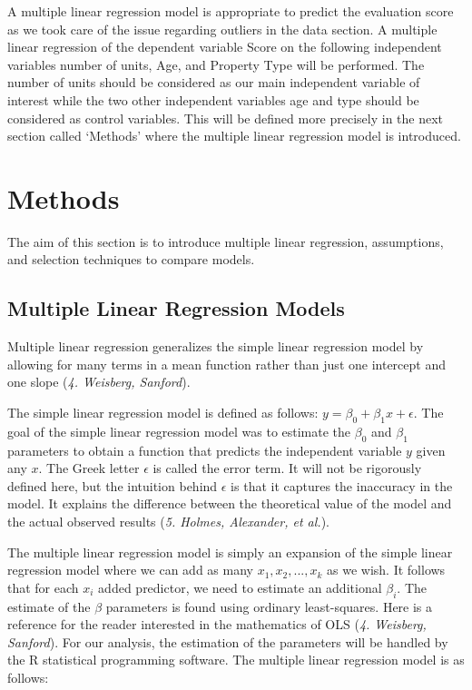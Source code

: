 \documentclass[
]{article}
\begin{document}
A multiple linear regression model is appropriate to predict the
evaluation score as we took care of the issue regarding outliers in the
data section. A multiple linear regression of the dependent variable
Score on the following independent variables number of units, Age, and
Property Type will be performed. The number of units should be
considered as our main independent variable of interest while the two
other independent variables age and type should be considered as control
variables. This will be defined more precisely in the next section
called `Methods' where the multiple linear regression model is
introduced.

\hypertarget{methods}{%
\section{Methods}\label{methods}}

The aim of this section is to introduce multiple linear regression,
assumptions, and selection techniques to compare models.

\hypertarget{multiple-linear-regression-models}{%
\subsection{Multiple Linear Regression
Models}\label{multiple-linear-regression-models}}

Multiple linear regression generalizes the simple linear regression
model by allowing for many terms in a mean function rather than just one
intercept and one slope (\emph{4. Weisberg, Sanford}).

The simple linear regression model is defined as follows:
\(y=\beta_0 + \beta_1x + \epsilon\). The goal of the simple linear
regression model was to estimate the \(\beta_0\) and \(\beta_1\)
parameters to obtain a function that predicts the independent variable
\(y\) given any \(x\). The Greek letter \(\epsilon\) is called the error
term. It will not be rigorously defined here, but the intuition behind
\(\epsilon\) is that it captures the inaccuracy in the model. It
explains the difference between the theoretical value of the model and
the actual observed results (\emph{5. Holmes, Alexander, et al.}).

The multiple linear regression model is simply an expansion of the
simple linear regression model where we can add as many
\(x_1, x_2, ..., x_k\) as we wish. It follows that for each \(x_i\)
added predictor, we need to estimate an additional \(\beta_i\). The
estimate of the \(\beta\) parameters is found using ordinary
least-squares. Here is a reference for the reader interested in the
mathematics of OLS (\emph{4. Weisberg, Sanford}). For our analysis, the
estimation of the parameters will be handled by the R statistical
programming software. The multiple linear regression model is as
follows:
\end{document}
